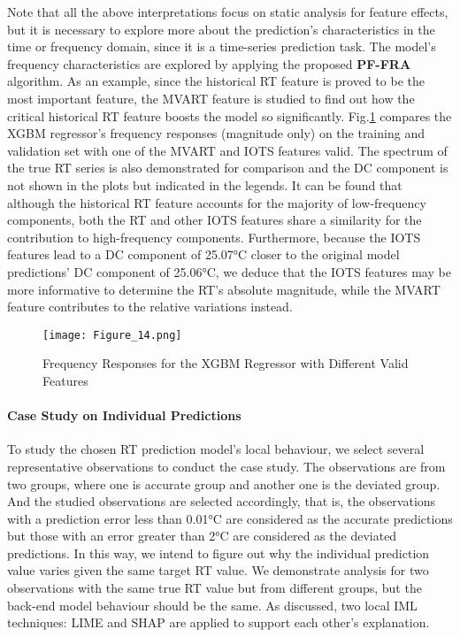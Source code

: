 \documentclass[11pt]{article}
\begin{document}
    Note that all the above interpretations focus on static analysis for feature effects, but it is necessary to explore more about the prediction’s characteristics in the time or frequency domain, since it is a time-series prediction task. The model’s frequency characteristics are explored by applying the proposed \textbf{PF-FRA} algorithm. As an example, since the historical RT feature is proved to be the most important feature, the MVART feature is studied to find out how the critical historical RT feature boosts the model so significantly. Fig.\ref{PFFRA} compares the XGBM regressor’s frequency responses (magnitude only) on the training and validation set with one of the MVART and IOTS features valid. The spectrum of the true RT series is also demonstrated for comparison and the DC component is not shown in the plots but indicated in the legends. It can be found that although the historical RT feature accounts for the majority of low-frequency components, both the RT and other IOTS features share a similarity for the contribution to high-frequency components. Furthermore, because the IOTS features lead to a DC component of 25.07°C closer to the original model predictions’ DC component of 25.06°C, we deduce that the IOTS features may be more informative to determine the RT’s absolute magnitude, while the MVART feature contributes to the relative variations instead.
    
    \begin{figure}[htbp]
    	\centering
    	\texttt{[image: Figure\_14.png]}
    	\caption{Frequency Responses for the XGBM Regressor with Different Valid Features}
    	\label{PFFRA}
    \end{figure}              
    
    \paragraph{Case Study on Individual Predictions}
    To study the chosen RT prediction model’s local behaviour, we select several representative observations to conduct the case study. The observations are from two groups, where one is accurate group and another one is the deviated group. And the studied observations are selected accordingly, that is, the observations with a prediction error less than 0.01°C are considered as the accurate predictions but those with an error greater than 2°C are considered as the deviated predictions. In this way, we intend to figure out why the individual prediction value varies given the same target RT value. We demonstrate analysis for two observations with the same true RT value but from different groups, but the back-end model behaviour should be the same. As discussed, two local IML techniques: LIME and SHAP are applied to support each other’s explanation.
    
\end{document}
